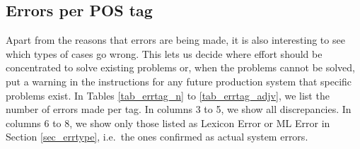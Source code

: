 \documentclass[a4paper,10pt,twoside]{article}
\begin{document}
\subsection{Errors per POS tag}
\label{sec_errtag}

Apart from the reasons that errors are being made, it is also interesting to see which types of cases go wrong. This lets us decide where effort should be concentrated to solve existing problems or, when the problems cannot be solved, put a warning in the instructions for any future production system that specific problems exist. In Tables \ref{tab_errtag_n} to \ref{tab_errtag_adjv}, we list the number of errors made per tag. In columns 3 to 5, we show all discrepancies. In columns 6 to 8, we show only those listed as Lexicon Error or ML Error in Section \ref{sec_errtype}, i.e.\ the ones confirmed as actual system errors.


\begin{table}[tbh]
\tabcolsep=0.11cm
\begin{center}
\caption{Errors per noun tag for best ML system}
\label{tab_errtag_n}
\end{center}
\end{table}
\end{document}
